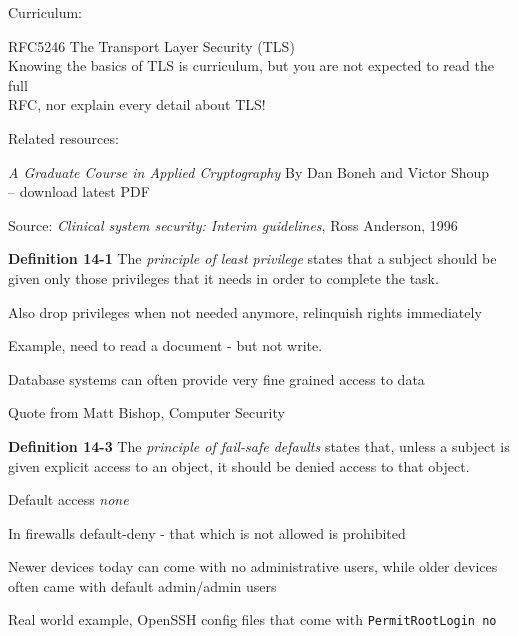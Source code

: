 \documentclass[Screen16to9,17pt]{foils}
\begin{document}

Curriculum:
\begin{list1}
\item RFC5246 The Transport Layer Security (TLS) \\
Knowing the basics of TLS is curriculum, but you are not expected to read the full\\
RFC, nor explain every detail about TLS!
\end{list1}

Related resources:
\begin{list1}
\item \emph{A Graduate Course in Applied Cryptography} By Dan Boneh and Victor Shoup\\
 -- download latest PDF
\end{list1}





Source:
\emph{Clinical system security: Interim guidelines}, Ross Anderson, 1996




\begin{list1}
\item {\bf Definition 14-1} The \emph{principle of least privilege} states that a subject should be given only those privileges that it needs in order to complete the task.
\item Also drop privileges when not needed anymore, relinquish rights immediately
\item Example, need to read a document - but not write.
\item Database systems can often provide very fine grained access to data
\end{list1}

Quote from Matt Bishop, Computer Security


\begin{list1}
\item {\bf Definition 14-3} The \emph{principle of fail-safe defaults} states that, unless a subject is given explicit access to an object, it should be denied access to that object.
\item Default access \emph{none}
\item In firewalls default-deny - that which is not allowed is prohibited
\item Newer devices today can come with no administrative users, while older devices often came with default admin/admin users
\item Real world example, OpenSSH config files that come with \verb+PermitRootLogin no+
\end{list1}
\end{document}
